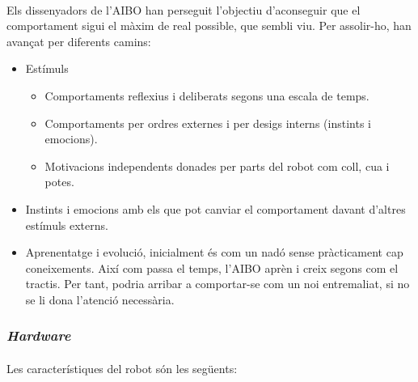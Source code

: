 \documentclass[12pt,a4paper,final,twoside]{article}
\begin{document}
\paragraph{}Els dissenyadors de l'AIBO han perseguit l'objectiu d'aconseguir que el comportament sigui el màxim de real possible, que sembli viu. Per assolir-ho, han avançat per diferents camins:
\begin{itemize}
\item Estímuls
\begin{itemize}
\item Comportaments reflexius i deliberats segons una escala de temps.
\item Comportaments per ordres externes i per desigs interns (instints i emocions).
\item Motivacions independents donades per parts del robot com coll, cua i potes.
\end{itemize}
\item Instints i emocions amb els que pot canviar el comportament davant d'altres estímuls externs.
\item Aprenentatge i evolució, inicialment és com un nadó sense pràcticament cap coneixements. Així com passa el temps, l'AIBO aprèn i creix segons com el tractis. Per tant, podria arribar a comportar-se com un noi entremaliat, si no se li dona l'atenció necessària.
\end{itemize}

\label{Hardware}
\subsubsection{\textit{Hardware}}

\paragraph{}Les característiques del robot són les següents: \cite{Anshar2007}
\end{document}
